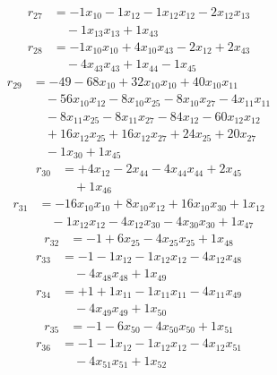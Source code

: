 \[\begin{aligned}
r_{27} &= - 1 x_{10} - 1 x_{12} - 1 x_{12} x_{12} - 2 x_{12} x_{13} \\
 &\quad - 1 x_{13} x_{13} + 1 x_{43}
\end{aligned}\]
\[\begin{aligned}
r_{28} &= - 1 x_{10} x_{10} + 4 x_{10} x_{43} - 2 x_{12} + 2 x_{43} \\
 &\quad - 4 x_{43} x_{43} + 1 x_{44} - 1 x_{45}
\end{aligned}\]
\[\begin{aligned}
r_{29} &= - 49 - 68 x_{10} + 32 x_{10} x_{10} + 40 x_{10} x_{11} \\
 &\quad - 56 x_{10} x_{12} - 8 x_{10} x_{25} - 8 x_{10} x_{27} - 4 x_{11} x_{11} \\
 &\quad - 8 x_{11} x_{25} - 8 x_{11} x_{27} - 84 x_{12} - 60 x_{12} x_{12} \\
 &\quad + 16 x_{12} x_{25} + 16 x_{12} x_{27} + 24 x_{25} + 20 x_{27} \\
 &\quad - 1 x_{30} + 1 x_{45}
\end{aligned}\]
\[\begin{aligned}
r_{30} &= + 4 x_{12} - 2 x_{44} - 4 x_{44} x_{44} + 2 x_{45} \\
 &\quad + 1 x_{46}
\end{aligned}\]
\[\begin{aligned}
r_{31} &= - 16 x_{10} x_{10} + 8 x_{10} x_{12} + 16 x_{10} x_{30} + 1 x_{12} \\
 &\quad - 1 x_{12} x_{12} - 4 x_{12} x_{30} - 4 x_{30} x_{30} + 1 x_{47}
\end{aligned}\]
\[\begin{aligned}
r_{32} &= - 1 + 6 x_{25} - 4 x_{25} x_{25} + 1 x_{48}
\end{aligned}\]
\[\begin{aligned}
r_{33} &= - 1 - 1 x_{12} - 1 x_{12} x_{12} - 4 x_{12} x_{48} \\
 &\quad - 4 x_{48} x_{48} + 1 x_{49}
\end{aligned}\]
\[\begin{aligned}
r_{34} &= + 1 + 1 x_{11} - 1 x_{11} x_{11} - 4 x_{11} x_{49} \\
 &\quad - 4 x_{49} x_{49} + 1 x_{50}
\end{aligned}\]
\[\begin{aligned}
r_{35} &= - 1 - 6 x_{50} - 4 x_{50} x_{50} + 1 x_{51}
\end{aligned}\]
\[\begin{aligned}
r_{36} &= - 1 - 1 x_{12} - 1 x_{12} x_{12} - 4 x_{12} x_{51} \\
 &\quad - 4 x_{51} x_{51} + 1 x_{52}
\end{aligned}\]
